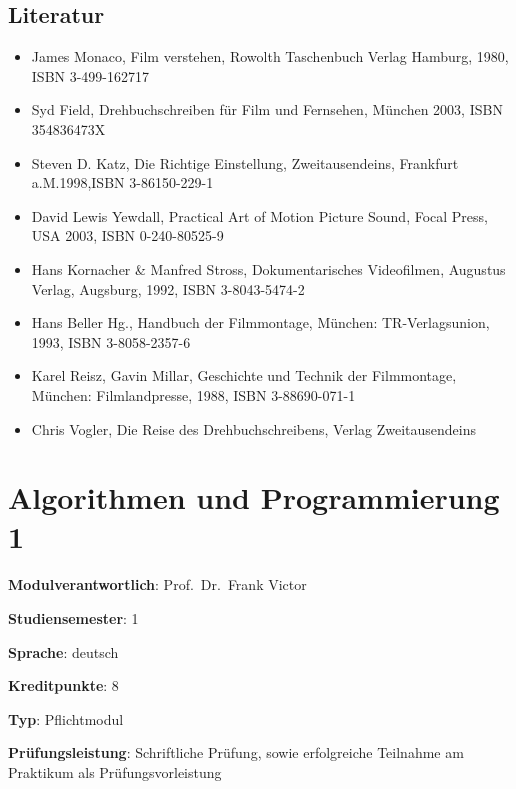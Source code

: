 \hypertarget{literaturpathlabelmi-2017modulbeschreibungen-bachelorba_avm}{%
\section*{Literatur\label{/mi-2017/modulbeschreibungen-bachelor/BA_AVM}}\label{literaturpathlabelmi-2017modulbeschreibungen-bachelorba_avm}}

\begin{itemize}
\tightlist
\item
  James Monaco, Film verstehen, Rowolth Taschenbuch Verlag Hamburg,
  1980, ISBN 3-499-162717
\item
  Syd Field, Drehbuchschreiben für Film und Fernsehen, München 2003,
  ISBN 354836473X
\item
  Steven D. Katz, Die Richtige Einstellung, Zweitausendeins, Frankfurt
  a.M.1998,ISBN 3-86150-229-1
\item
  David Lewis Yewdall, Practical Art of Motion Picture Sound, Focal
  Press, USA 2003, ISBN 0-240-80525-9
\item
  Hans Kornacher \& Manfred Stross, Dokumentarisches Videofilmen,
  Augustus Verlag, Augsburg, 1992, ISBN 3-8043-5474-2
\item
  Hans Beller Hg., Handbuch der Filmmontage, München: TR-Verlagsunion,
  1993, ISBN 3-8058-2357-6
\item
  Karel Reisz, Gavin Millar, Geschichte und Technik der Filmmontage,
  München: Filmlandpresse, 1988, ISBN 3-88690-071-1
\item
  Chris Vogler, Die Reise des Drehbuchschreibens, Verlag Zweitausendeins
\end{itemize}

\hypertarget{algorithmen-und-programmierung-1pathlabelmi-2017modulbeschreibungen-bachelorba_algorithmenundprogrammierung1}{%
\chapter{Algorithmen und Programmierung
1\label{/mi-2017/modulbeschreibungen-bachelor/BA_AlgorithmenundProgrammierung1}}\label{algorithmen-und-programmierung-1pathlabelmi-2017modulbeschreibungen-bachelorba_algorithmenundprogrammierung1}}

\begin{modulHead}
\textbf{Modulverantwortlich}: Prof.~Dr.~Frank
Victor
\end{modulHead}
\begin{modulHead}
\textbf{Studiensemester}:
1
\end{modulHead}
\begin{modulHead}
\textbf{Sprache}:
deutsch
\end{modulHead}
\begin{modulHead}
\textbf{Kreditpunkte}:
8
\end{modulHead}
\begin{modulHead}
\textbf{Typ}:
Pflichtmodul
\end{modulHead}
\begin{modulHead}
\textbf{Prüfungsleistung}:
Schriftliche Prüfung, sowie erfolgreiche Teilnahme am Praktikum als
Prüfungsvorleistung
\end{modulHead}


